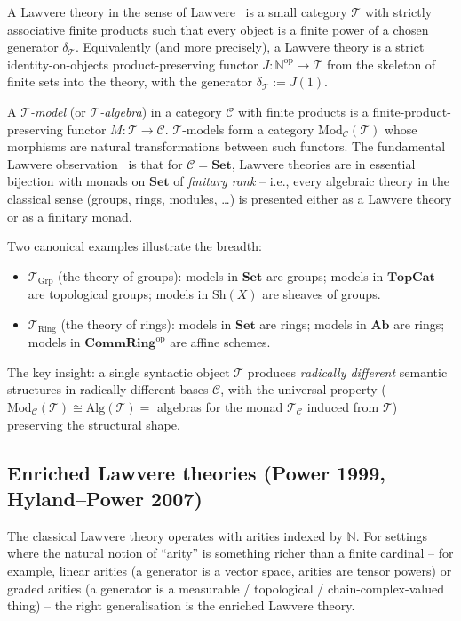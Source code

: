 \documentclass[11pt,a4paper]{article}
\theoremstyle{plain}
\theoremstyle{definition}
\theoremstyle{remark}
\newcommand{\N}{\mathbb{N}}
\newcommand{\cat}[1]{\mathbf{#1}}
\newcommand{\Set}{\cat{Set}}
\newcommand{\Mod}{\mathrm{Mod}}
\newcommand{\op}{\mathrm{op}}
\begin{document}
A Lawvere theory in the sense of Lawvere~\cite{Law63} is a small category $\mathcal{T}$ with strictly associative finite products such that every object is a finite power of a chosen generator $\delta_{\mathcal{T}}$. Equivalently (and more precisely), a Lawvere theory is a strict identity-on-objects product-preserving functor $J : \N^{\op} \to \mathcal{T}$ from the skeleton of finite sets into the theory, with the generator $\delta_{\mathcal{T}} := J(1)$.

A \emph{$\mathcal{T}$-model} (or \emph{$\mathcal{T}$-algebra}) in a category $\mathcal{C}$ with finite products is a finite-product-preserving functor $M : \mathcal{T} \to \mathcal{C}$. $\mathcal{T}$-models form a category $\Mod_{\mathcal{C}}(\mathcal{T})$ whose morphisms are natural transformations between such functors. The fundamental Lawvere observation~\cite{Law63} is that for $\mathcal{C} = \Set$, Lawvere theories are in essential bijection with monads on $\Set$ of \emph{finitary rank} -- i.e., every algebraic theory in the classical sense (groups, rings, modules, \dots) is presented either as a Lawvere theory or as a finitary monad.

Two canonical examples illustrate the breadth:

\begin{itemize}[leftmargin=*]
\item $\mathcal{T}_{\mathrm{Grp}}$ (the theory of groups): models in $\Set$ are groups; models in $\cat{TopCat}$ are topological groups; models in $\mathrm{Sh}(X)$ are sheaves of groups.
\item $\mathcal{T}_{\mathrm{Ring}}$ (the theory of rings): models in $\Set$ are rings; models in $\cat{Ab}$ are rings; models in $\cat{CommRing}^{\op}$ are affine schemes.
\end{itemize}

The key insight: a single syntactic object $\mathcal{T}$ produces \emph{radically different} semantic structures in radically different bases $\mathcal{C}$, with the universal property ($\Mod_{\mathcal{C}}(\mathcal{T}) \cong \mathrm{Alg}(\mathcal{T}) =$ algebras for the monad $\mathcal{T}_{\mathcal{C}}$ induced from $\mathcal{T}$) preserving the structural shape.

\subsection{Enriched Lawvere theories (Power 1999, Hyland--Power 2007)}\label{sec:background:enriched}

The classical Lawvere theory operates with arities indexed by $\N$. For settings where the natural notion of ``arity'' is something richer than a finite cardinal -- for example, linear arities (a generator is a vector space, arities are tensor powers) or graded arities (a generator is a measurable / topological / chain-complex-valued thing) -- the right generalisation is the enriched Lawvere theory.
\end{document}

